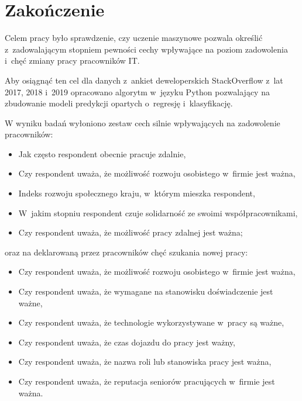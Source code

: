\chapter*{Zakończenie}\label{ch:ending}

Celem pracy było sprawdzenie, czy uczenie maszynowe pozwala określić z~zadowalającym stopniem
pewności cechy wpływające na poziom zadowolenia i~chęć zmiany pracy pracowników IT.

Aby osiągnąć ten cel dla danych z~ankiet deweloperskich StackOverflow \cite{so-survey-info} z~lat 2017, 2018 i~2019
opracowano algorytm w~języku Python pozwalający na zbudowanie modeli predykcji opartych o~regresję i~klasyfikację.

W wyniku badań wyłoniono zestaw cech silnie wpływających na zadowolenie pracowników:

\begin{itemize}
    \item Jak często respondent obecnie pracuje zdalnie,
    \item Czy respondent uważa, że możliwość rozwoju osobistego w~firmie jest ważna,
    \item Indeks rozwoju społecznego kraju, w~którym mieszka respondent,
    \item W~jakim stopniu respondent czuje solidarność ze swoimi współpracownikami,
    \item Czy respondent uważa, że możliwość pracy zdalnej jest ważna;
\end{itemize}

oraz na deklarowaną przez pracowników chęć szukania nowej pracy:

\begin{itemize}
    \item Czy respondent uważa, że możliwość rozwoju osobistego w~firmie jest ważna,
    \item Czy respondent uważa, że wymagane na stanowisku doświadczenie jest ważne,
    \item Czy respondent uważa, że technologie wykorzystywane w~pracy są ważne,
    \item Czy respondent uważa, że czas dojazdu do pracy jest ważny,
    \item Czy respondent uważa, że nazwa roli lub stanowiska pracy jest ważna,
    \item Czy respondent uważa, że reputacja seniorów pracujących w~firmie jest ważna.
\end{itemize}

